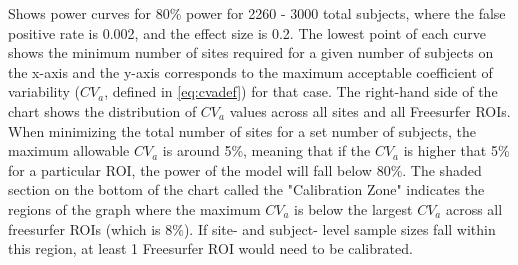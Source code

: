 \label{fig:cv_j} Shows power curves for 80\% power for 2260 - 3000 total subjects, where the false positive rate is 0.002, and the effect size is 0.2. The lowest point of each curve shows the minimum number of sites required for a given number of subjects on the x-axis and the y-axis corresponds to the maximum acceptable coefficient of variability ($CV_{a}$, defined in \ref{eq:cvadef}) for that case. The right-hand side of the chart shows the distribution of $CV_{a}$ values across all sites and all Freesurfer ROIs. When minimizing the total number of sites for a set number of subjects, the maximum allowable $CV_{a}$ is around 5\%, meaning that if the $CV_{a}$ is higher that 5\% for a particular ROI, the power of the model will fall below 80\%. The shaded section on the bottom of the chart called the "Calibration Zone" indicates the regions of the graph where the maximum $CV_{a}$ is below the largest $CV_{a}$ across all freesurfer ROIs (which is 8\%). If site- and subject- level sample sizes fall within this region, at least 1 Freesurfer ROI would need to be calibrated.